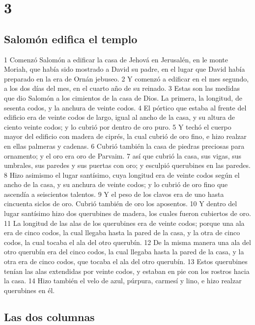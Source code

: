 \chapter{3}

\section*{Salomón edifica el templo }

1 Comenzó Salomón a edificar la casa de Jehová en Jerusalén, en le monte Moriah, que había sido mostrado a David su padre, en el lugar que David había preparado en la era de Ornán jebuseo.
2 Y comenzó a edificar en el mes segundo, a los dos días del mes, en el cuarto año de su reinado.
3 Estas son las medidas que dio Salomón a los cimientos de la casa de Dios. La primera, la longitud, de sesenta codos,  y la anchura de veinte codos.
4 El pórtico que estaba al frente del edificio era de veinte codos   de largo, igual al ancho de la casa, y su altura de ciento veinte codos; y lo cubrió por dentro de oro puro.
5 Y techó el cuerpo mayor del edificio con madera de ciprés, la cual cubrió de oro fino, e hizo realzar en ellas palmeras y cadenas.
6 Cubrió también la casa de piedras preciosas para ornamento; y el oro era oro de Parvaim.
7 así que cubrió la casa, sus vigas, sus umbrales, sus paredes y sus puertas con oro; y esculpió querubines en las paredes.
8 Hizo asimismo el lugar santísimo, cuya longitud era de veinte codos   según el ancho de la casa, y su anchura de veinte codos; y lo cubrió de oro fino que ascendía a seiscientos talentos.
9 Y el peso de los clavos era de uno hasta cincuenta siclos de oro.  Cubrió también de oro los aposentos.
10 Y dentro del lugar santísimo hizo dos querubines de madera, los cuales fueron cubiertos de oro.
11 La longitud de las alas de los querubines era de veinte codos;  porque una ala era de cinco codos, la cual llegaba hasta la pared de la casa, y la otra de cinco codos, la cual tocaba el ala del otro querubín.
12 De la misma manera una ala del otro querubín era del cinco codos,  la cual llegaba hasta la pared de la casa, y la otra era de cinco codos, que tocaba el ala del otro querubín.
13 Estos querubines tenían las alas extendidas por veinte codos,  y estaban en pie con los rostros hacia la casa.
14 Hizo también el velo de azul, púrpura, carmesí y lino, e hizo realzar querubines en él.

\section*{Las dos columnas }

